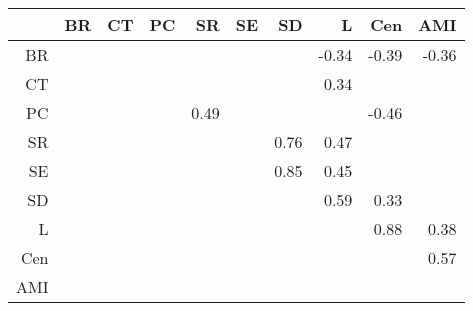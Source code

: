 \begin{table}[ht]
\centering
\begin{tabular}{rrrrrrrrrr}
  \hline
 & BR & CT & PC & SR & SE & SD & L & Cen & AMI \\ 
  \hline
BR &  &  &  &  &  &  & -0.34 & -0.39 & -0.36 \\ 
  CT &  &  &  &  &  &  & 0.34 &  &  \\ 
  PC &  &  &  & 0.49 &  &  &  & -0.46 &  \\ 
  SR &  &  &  &  &  & 0.76 & 0.47 &  &  \\ 
  SE &  &  &  &  &  & 0.85 & 0.45 &  &  \\ 
  SD &  &  &  &  &  &  & 0.59 & 0.33 &  \\ 
  L &  &  &  &  &  &  &  & 0.88 & 0.38 \\ 
  Cen &  &  &  &  &  &  &  &  & 0.57 \\ 
  AMI &  &  &  &  &  &  &  &  &  \\ 
   \hline
\end{tabular}
\end{table}

